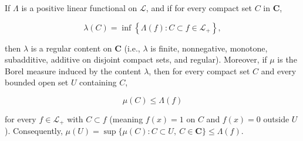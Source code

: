 If $\Lambda$ is a positive linear functional on $\mathcal{L}$, and if for every compact set $C$ in $\mathbf{C}$,

$$\lambda(C) = \inf \left\{ \Lambda(f) : C \subset f \in \mathcal{L}_+ \right\},$$

then $\lambda$ is a regular content on $\mathbf{C}$ (i.e., $\lambda$ is finite, nonnegative, monotone, subadditive, additive on disjoint compact sets, and regular). Moreover, if $\mu$ is the Borel measure induced by the content $\lambda$, then for every compact set $C$ and every bounded open set $U$ containing $C$,

$$\mu(C) \leq \Lambda(f)$$

for every $f \in \mathcal{L}_+$ with $C \subset f$ (meaning $f(x) = 1$ on $C$ and $f(x) = 0$ outside $U$). Consequently, $\mu(U) = \sup \{\mu(C) : C \subset U,\ C \in \mathbf{C}\} \leq \Lambda(f)$.
